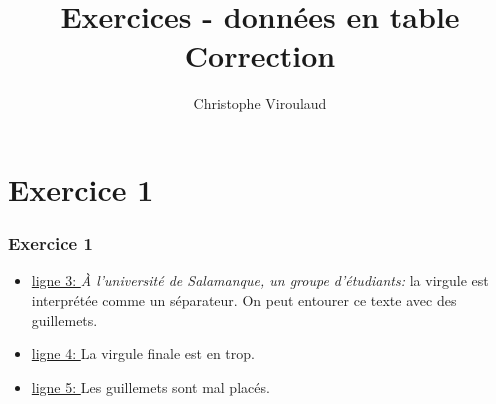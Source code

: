 \documentclass[svgnames,11pt]{beamer}
\author[]{Christophe Viroulaud}
\title{Exercices - données en table\\Correction}
\date{\framebox{\textbf{Tab 03}}}
\institute{Première - NSI}
\begin{document}
\begin{frame}
    \titlepage
\end{frame}
\section{Exercice 1}
\begin{frame}
    \frametitle{Exercice 1}

    \begin{itemize}
        \item \underline{ligne 3: }\emph{À l'université de Salamanque, un groupe d'étudiants:} la virgule est interprétée comme un séparateur. On peut entourer ce texte avec des guillemets.
        \item \underline{ligne 4: } La virgule finale est en trop.
        \item \underline{ligne 5: } Les guillemets sont mal placés.
    \end{itemize}

\end{frame}
\end{document}
